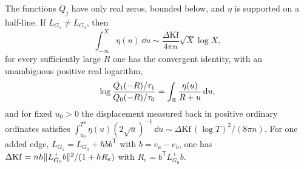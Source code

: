\begin{theorem}\label{zer:thm:squared}
The functions $Q_j$ have only real zeros, bounded below, and $\eta$ is supported on a half-line. If
$L_{G_1}\ne L_{G_0}$, then
\[
 \int_{-\infty}^X\eta(u)\,\dd u\sim\frac{\Delta\mathrm{Kf}}{4\pi n}\sqrt X\log X,
\]
for every sufficiently large $R$ one has the convergent identity, with an unambiguous positive real
logarithm,
\[
 \log\frac{Q_1(-R)/\tau_1}{Q_0(-R)/\tau_0}=\int_{\mathbb{R}}\frac{\eta(u)}{R+u}\,\mathrm{d} u,
\]
and for fixed $u_0>0$ the displacement measured back in positive ordinary ordinates satisfies
$\int_{u_0}^{T^2}\eta(u)(2\sqrt u)^{-1}\,\dd u\sim\Delta\mathrm{Kf}\,(\log T)^2/(8\pi n)$. For one added edge,
$L_{G_1}=L_{G_0}+hbb^{\mathsf T}$ with $b=e_a-e_b$, one has
$\Delta\mathrm{Kf}=nh\lVert L_{G_0}^+b\rVert^2/(1+hR_e)$ with $R_e=b^{\mathsf T}L_{G_0}^+b$.
\end{theorem}

